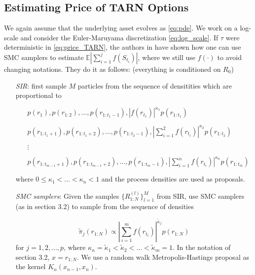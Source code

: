 \documentclass{article}
\begin{document}
\subsection{Estimating Price of TARN Options}
We again assume that the underlying asset evolves as \eqref{eq:pde}. We work on a log-scale and consider the Euler-Maruyama discretization \eqref{eq:log_scale}. If $\tau$ were deterministic in \eqref{eq:price_TARN}, the authors in \cite{SMC_option_jasra} have shown how one can use SMC samplers to estimate $\mathbb{E} \left | \sum_{i=1}^{j} f(S_{t_{i}}) \right | $, where we still use $f(\cdot)$ to avoid changing notations. They do it as follows:
(everything is conditioned on $R_{0}$)
\begin{itemize}
\item[\textit{SIR}:] first sample $M$ particles from the sequence of densitities which are proportional to 
\begin{itemize}
\item[] $p(r_{1}), p(r_{1:2}), \ldots, p(r_{1:t_{1}-1}), | f(r_{t_{1}}) | ^{\kappa_{1}} p(r_{1:t_{1}})$
\item[] $p(r_{1:t_{1}+1}), p(r_{1:t_{1}+2}), \ldots, p(r_{1:t_{2}-1}), \left | \sum_{i=1}^{2} f(r_{t_{i}}) \right |^{\kappa_{2}} p(r_{1:t_{2}})$
\item[] $\vdots$
\item[] $p(r_{1:t_{m-1}+1}), p(r_{1:t_{m-1}+2}), \ldots, p(r_{1:t_{m}-1}), \left | \sum_{i=1}^{n} f(r_{t_{i}}) \right |^{\kappa_{n}} p(r_{1:t_{m}})$
\end{itemize}

where $ 0 \leq \kappa_{1} < \ldots < \kappa_{n} < 1 $ and the process densities are used as proposals.

\item[\textit{SMC samplers}:] Given the samples $\{ R_{1:N}^{(l)} \}_{l=1}^{M}$ from SIR, use SMC samplers (as in section 3.2) to sample from the sequence of densities 

\begin{equation} \label{eq:SMC_sampler_target}
\tilde{\pi}_{j} (r_{1:N}) \propto \left | \sum_{i=1}^{m} f(r_{t_{i}}) \right |^{\tilde{\kappa}_{j}} p(r_{1:N}) 
\end{equation}
for $j = 1, 2, \ldots, p$, where $\kappa_{n} = \tilde{\kappa}_{1} < \tilde{\kappa}_{2} < \ldots < \tilde{\kappa}_{m} = 1$. In the notation of section 3.2, $x = r_{1:N}$. We use a random walk Metropolis-Hastings proposal as the kernel $K_{n}(x_{n-1},x_{n})$.
\end{itemize}
\end{document}
